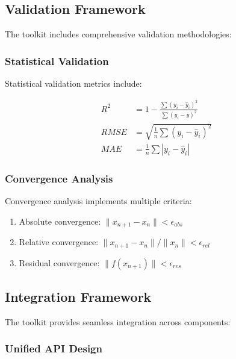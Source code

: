 \documentclass[11pt,a4paper]{article}
\begin{document}
\subsection{Validation Framework}
\label{subsec:validation_framework}

The toolkit includes comprehensive validation methodologies:

\subsubsection{Statistical Validation}
\label{subsubsec:statistical_validation}

Statistical validation metrics include:

\begin{align}
R^2 &= 1 - \frac{\sum (y_i - \hat{y}_i)^2}{\sum (y_i - \bar{y})^2} \label{eq:r_squared} \\
RMSE &= \sqrt{\frac{1}{n} \sum (y_i - \hat{y}_i)^2} \label{eq:rmse} \\
MAE &= \frac{1}{n} \sum |y_i - \hat{y}_i| \label{eq:mae}
\end{align}

\subsubsection{Convergence Analysis}
\label{subsubsec:convergence_analysis}

Convergence analysis implements multiple criteria:

\begin{enumerate}
    \item Absolute convergence: $\|x_{n+1} - x_n\| < \epsilon_{abs}$
    \item Relative convergence: $\|x_{n+1} - x_n\| / \|x_n\| < \epsilon_{rel}$
    \item Residual convergence: $\|f(x_{n+1})\| < \epsilon_{res}$
\end{enumerate}

\subsection{Integration Framework}
\label{subsec:integration_framework}

The toolkit provides seamless integration across components:

\subsubsection{Unified API Design}
\label{subsubsec:unified_api}
\end{document}

